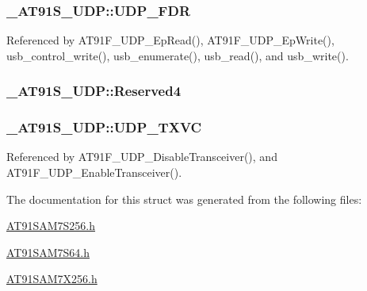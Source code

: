 \hypertarget{struct__AT91S__UDP_54d00cd461a9f587e9cb972da54e48fb}{
\subsubsection{ {\bf \_\-AT91S\_\-UDP::UDP\_\-FDR}}}
\label{struct__AT91S__UDP_54d00cd461a9f587e9cb972da54e48fb}




Referenced by AT91F\_\-UDP\_\-EpRead(), AT91F\_\-UDP\_\-EpWrite(), usb\_\-control\_\-write(), usb\_\-enumerate(), usb\_\-read(), and usb\_\-write().\hypertarget{struct__AT91S__UDP_daf5abeb7f583c4d7e4f9765ed8af068}{
\subsubsection{ {\bf \_\-AT91S\_\-UDP::Reserved4}}}
\label{struct__AT91S__UDP_daf5abeb7f583c4d7e4f9765ed8af068}


\hypertarget{struct__AT91S__UDP_f4a766ffccdbe79e17f95783df644e03}{
\subsubsection{ {\bf \_\-AT91S\_\-UDP::UDP\_\-TXVC}}}
\label{struct__AT91S__UDP_f4a766ffccdbe79e17f95783df644e03}




Referenced by AT91F\_\-UDP\_\-DisableTransceiver(), and AT91F\_\-UDP\_\-EnableTransceiver().

The documentation for this struct was generated from the following files:\begin{CompactItemize}
\item 
\hyperlink{AT91SAM7S256_8h}{AT91SAM7S256.h}\item 
\hyperlink{AT91SAM7S64_8h}{AT91SAM7S64.h}\item 
\hyperlink{AT91SAM7X256_8h}{AT91SAM7X256.h}\end{CompactItemize}
